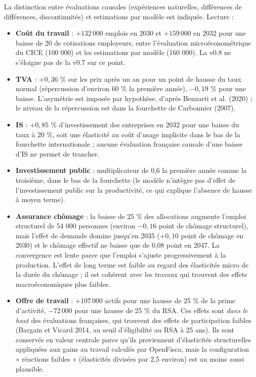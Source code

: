 La distinction entre évaluations causales (expériences naturelles, différences de différences, discontinuités) et
estimations par modèle est indiquée. Lecture :
\begin{itemize}
\item \textbf{Coût du travail} : $+132\,000$ emplois en 2030 et $+159\,000$ en 2032 pour une baisse de 20\md{} de
cotisations employeurs, entre l'évaluation microéconométrique du CICE (100 000) et les estimations par modèle (160 000).
La v0.8 ne s'éloigne pas de la v0.7 sur ce point.
\item \textbf{TVA} : $+0{,}36$ \% sur les prix après un an pour un point de hausse du taux normal (répercussion
d'environ 60 \% la première année), $-0{,}19$ \% pour une baisse. L'asymétrie est imposée par hypothèse, d'après
Benzarti et al. (2020) ; le niveau de la répercussion est dans la fourchette de Carbonnier (2007).
\item \textbf{IS} : $+0{,}85$ \% d'investissement des entreprises en 2032 pour une baisse du taux à 20 \%, soit une
élasticité au coût d'usage implicite dans le bas de la fourchette internationale ; aucune évaluation française causale
d'une baisse d'IS ne permet de trancher.
\item \textbf{Investissement public} : multiplicateur de 0,6 la première année comme la troisième, dans le bas de la
fourchette (le modèle n'intègre pas d'effet de l'investissement public sur la productivité, ce qui explique l'absence
de hausse à moyen terme).
\item \textbf{Assurance chômage} : la baisse de 25 \% des allocations augmente l'emploi structurel de 54 000 personnes
(environ $-0{,}16$ point de chômage structurel), mais l'effet de demande domine jusqu'en 2035 ($+0{,}10$ point de
chômage en 2030) et le chômage effectif ne baisse que de 0,08 point en 2047. La convergence est lente parce que l'emploi
s'ajuste progressivement à la production. L'effet de long terme est faible au regard des élasticités micro de la durée
du chômage ; il est cohérent avec les travaux qui trouvent des effets macroéconomiques plus faibles.
\item \textbf{Offre de travail} : $+107\,000$ actifs pour une hausse de 25 \% de la prime d'activité, $-72\,000$ pour
une hausse de 25 \% du RSA. Ces effets sont \emph{dans le haut} des évaluations françaises, qui trouvent des effets de
participation faibles (Bargain et Vicard 2014, au seuil d'éligibilité au RSA à 25 ans). Ils sont conservés en valeur
centrale parce qu'ils proviennent d'élasticités structurelles appliquées aux gains au travail calculés par OpenFisca,
mais la configuration « réactions faibles » (élasticités divisées par 2,5 environ) est au moins aussi plausible.
\end{itemize}
